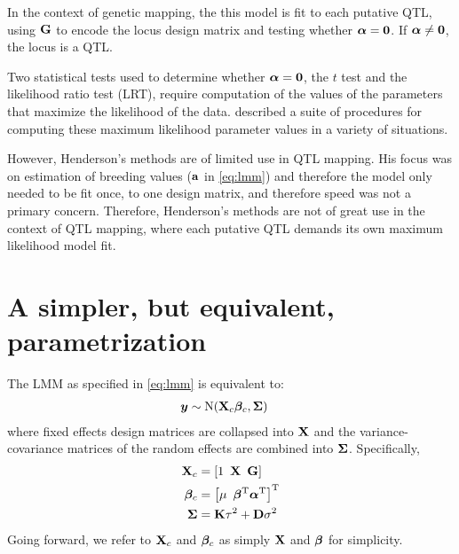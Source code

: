 In the context of genetic mapping, the this model is fit to each putative QTL, using $\mathbf{G}$ to encode the locus design matrix and testing whether $\boldsymbol{\alpha} = \bm{0}$.
If $\boldsymbol{\alpha} \neq \bm{0}$, the locus is a QTL.

Two statistical tests used to determine whether $\boldsymbol{\alpha} = \bm{0}$, the $t$ test and the likelihood ratio test (LRT), require computation of the values of the parameters that maximize the likelihood of the data.
\citet{Henderson1984} described a suite of procedures for computing these maximum likelihood parameter values in a variety of situations.

However, Henderson's methods are of limited use in QTL mapping.
His focus was on estimation of breeding values ($\mathbf{a}$ in \cref{eq:lmm}) and therefore the model only needed to be fit once, to one design matrix, and therefore speed was not a primary concern.
Therefore, Henderson's methods are not of great use in the context of QTL mapping, where each putative QTL demands its own maximum likelihood model fit.







\newpage
\section{A simpler, but equivalent, parametrization}

The LMM as specified in \cref{eq:lmm} is equivalent to:
\begin{align}
    \bm{y} &\sim \mathrm{N}(\mathbf{X}_c\boldsymbol{\beta}_c, \mathbf{\Sigma})
\end{align}
where fixed effects design matrices are collapsed into $\mathbf{X}$ and the variance-covariance matrices of the random effects are combined into $\mathbf{\Sigma}$.
Specifically,
\begin{align}
    \mathbf{X}_c     &= \left[1 \enspace \mathbf{X} \enspace \mathbf{G} \right]\\
    \boldsymbol{\beta}_c  &= \left[\mu \enspace \boldsymbol{\beta}^\mathrm{T} \boldsymbol{\alpha}^\mathrm{T} \right]^\mathrm{T}\\
    \mathbf{\Sigma} &= \mathbf{K} \tau^2 + \mathbf{D} \sigma^2
\end{align}
Going forward, we refer to $\mathbf{X}_c$ and $\boldsymbol{\beta}_c$ as simply $\mathbf{X}$ and $\boldsymbol{\beta}$ for simplicity.

